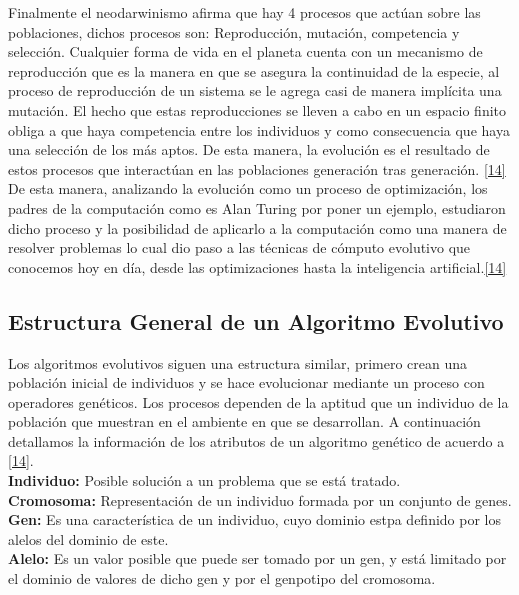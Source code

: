 		Finalmente el neodarwinismo afirma que hay 4 procesos que actúan sobre las poblaciones, dichos procesos son: Reproducción, mutación, competencia y selección. Cualquier forma de vida en el planeta cuenta con un mecanismo de reproducción que es la manera en que se asegura la continuidad de la especie, al proceso de reproducción de un sistema se le agrega casi de manera implícita una mutación. El hecho que estas reproducciones se lleven a cabo en un espacio finito obliga a que haya competencia entre los individuos y como consecuencia que haya una selección de los más aptos. De esta manera, la evolución es el resultado de estos procesos que interactúan en las poblaciones generación tras generación. \ref{14}\\

		De esta manera, analizando la evolución como un proceso de optimización, los padres de la computación como es Alan Turing por poner un ejemplo, estudiaron dicho proceso y la posibilidad de aplicarlo a la computación como una manera de resolver problemas lo cual dio paso a las técnicas de cómputo evolutivo que conocemos hoy en día, desde las optimizaciones hasta la inteligencia artificial.\ref{14} \\

		\subsection{Estructura General de un Algoritmo Evolutivo}

		Los algoritmos evolutivos siguen una estructura similar, primero crean una población inicial de individuos y se hace evolucionar mediante un proceso con operadores genéticos. Los procesos dependen de la aptitud que un individuo de la población que muestran en el ambiente en que se desarrollan. A continuación detallamos la información de los atributos de un algoritmo genético de acuerdo a \ref{14}.\\

		\textbf{Individuo:} Posible solución a un problema que se está tratado.\\

		\textbf{Cromosoma:} Representación de un individuo formada por un conjunto de genes.\\

		\textbf{Gen:} Es una característica de un individuo, cuyo dominio estpa definido por los alelos del dominio de este.\\

		\textbf{Alelo:} Es un valor posible que puede ser tomado por un gen, y está limitado por el dominio de valores de dicho gen y por el genpotipo del cromosoma.\\

